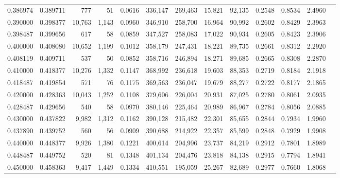 \begin{tabular}{rrrrrrrrrrrrr}
0.386974 & 0.389711 &    777 &    51 &                                     0.0616 & 336,147 & 269,463 &  15,821 &  92,135 & 0.2548 & 0.8534 & 2.4960 \\
0.390000 & 0.398377 & 10,763 & 1,143 &                                     0.0960 & 346,910 & 258,700 &  16,964 &  90,992 & 0.2602 & 0.8429 & 2.3963 \\
0.398487 & 0.399656 &    617 &    58 &                                     0.0859 & 347,527 & 258,083 &  17,022 &  90,934 & 0.2605 & 0.8423 & 2.3906 \\
0.400000 & 0.408080 & 10,652 & 1,199 &                                     0.1012 & 358,179 & 247,431 &  18,221 &  89,735 & 0.2661 & 0.8312 & 2.2920 \\
0.408119 & 0.409711 &    537 &    50 &                                     0.0852 & 358,716 & 246,894 &  18,271 &  89,685 & 0.2665 & 0.8308 & 2.2870 \\
0.410000 & 0.418377 & 10,276 & 1,332 &                                     0.1147 & 368,992 & 236,618 &  19,603 &  88,353 & 0.2719 & 0.8184 & 2.1918 \\
0.418487 & 0.419854 &    571 &    76 &                                     0.1175 & 369,563 & 236,047 &  19,679 &  88,277 & 0.2722 & 0.8177 & 2.1865 \\
0.420000 & 0.428363 & 10,043 & 1,252 &                                     0.1108 & 379,606 & 226,004 &  20,931 &  87,025 & 0.2780 & 0.8061 & 2.0935 \\
0.428487 & 0.429656 &    540 &    58 &                                     0.0970 & 380,146 & 225,464 &  20,989 &  86,967 & 0.2784 & 0.8056 & 2.0885 \\
0.430000 & 0.437822 &  9,982 & 1,312 &                                     0.1162 & 390,128 & 215,482 &  22,301 &  85,655 & 0.2844 & 0.7934 & 1.9960 \\
0.437890 & 0.439752 &    560 &    56 &                                     0.0909 & 390,688 & 214,922 &  22,357 &  85,599 & 0.2848 & 0.7929 & 1.9908 \\
0.440000 & 0.448377 &  9,926 & 1,380 &                                     0.1221 & 400,614 & 204,996 &  23,737 &  84,219 & 0.2912 & 0.7801 & 1.8989 \\
0.448487 & 0.449752 &    520 &    81 &                                     0.1348 & 401,134 & 204,476 &  23,818 &  84,138 & 0.2915 & 0.7794 & 1.8941 \\
0.450000 & 0.458363 &  9,417 & 1,449 &                                     0.1334 & 410,551 & 195,059 &  25,267 &  82,689 & 0.2977 & 0.7660 & 1.8068 \\

\end{tabular}
